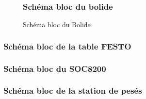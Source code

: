\documentclass[10pt,a4paper,final]{article}
\begin{document}
\begin{spacing}{1.5}
\begin{figure}[hbtp]
\subsubsection{Schéma bloc du bolide}
\caption{Schéma bloc du Bolide}
\centering
{}
\end{figure}

\vfill
\pagebreak

\subsubsection{Schéma bloc de la table FESTO}

\vfill
\pagebreak

\subsubsection{Schéma bloc du SOC8200}

\vfill
\pagebreak

\subsubsection{Schéma bloc de la station de pesés}


\end{spacing}
\end{document}
